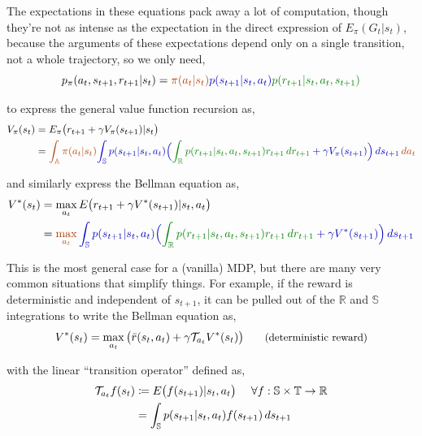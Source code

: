 The expectations in these equations pack away a lot of computation, though they're not as intense as the expectation in the direct expression of $E_\pi(G_t|s_t)$, because the arguments of these expectations depend only on a single transition, not a whole trajectory, so we only need,
\begin{equation*}
p_\pi(a_t, s_{t+1}, r_{t+1}|s_t) = \orange{\pi(a_t|s_t)} \blue{p(s_{t+1}|s_t,a_t)} \green{p(r_{t+1}|s_t,a_t,s_{t+1})}
\end{equation*}

to express the general value function recursion as,
\begin{align*}
V_\pi(s_t) &= E_\pi\big{(}r_{t+1} + \gamma V_{\pi}(s_{t+1}) | s_t\big{)}\\
&= \orange{\int_{\mathbb{A}} \pi(a_t|s_t) \blue{\int_{\mathbb{S}} p(s_{t+1}|s_t,a_t) \Big{(}\green{\int_{\mathbb{R}}p(r_{t+1}|s_t,a_t,s_{t+1}) r_{t+1} \,dr_{t+1}} + \gamma V_{\pi}(s_{t+1}) \Big{)}\,ds_{t+1}}\,da_t}
\end{align*}

and similarly express the Bellman equation as,
\begin{align*}
V^*(s_t) &= \max_{a_t} E\big{(}r_{t+1} + \gamma V^*(s_{t+1}) | s_t, a_t\big{)}\\
&= \orange{\max_{a_t} \blue{\int_{\mathbb{S}} p(s_{t+1}|s_t,a_t) \Big{(}\green{\int_{\mathbb{R}} p(r_{t+1}|s_t,a_t,s_{t+1})r_{t+1} \,dr_{t+1}} + \gamma V^*(s_{t+1}) \Big{)}\,ds_{t+1}}}
\end{align*}

This is the most general case for a (vanilla) MDP, but there are many very common situations that simplify things. For example, if the reward is deterministic and independent of $s_{t+1}$, it can be pulled out of the $\mathbb{R}$ and $\mathbb{S}$ integrations to write the Bellman equation as,
\begin{equation*}
V^*(s_t) = \max_{a_t} \big{(} \bar{r}(s_t, a_t) + \gamma \mathcal{T}_{a_t} V^*(s_t) \big{)} \small{\tag{deterministic reward}}
\end{equation*}

with the linear ``transition operator'' defined as,
\begin{align*}
\mathcal{T}_{a_t} f(s_t) &\coloneqq E\big{(}f(s_{t+1})|s_t,a_t\big{)}\ \ \ \ \forall f : \mathbb{S} \times \mathbb{T} \to \mathbb{R}\\
&= \int_{\mathbb{S}}p(s_{t+1}|s_t,a_t)f(s_{t+1})\,ds_{t+1}
\end{align*}

